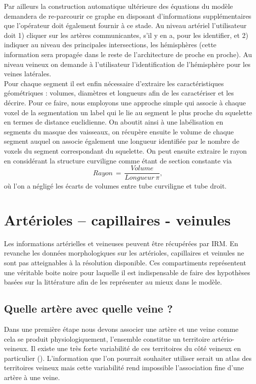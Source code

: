 Par ailleurs la construction automatique ultérieure des équations du modèle demandera de re-parcourir ce graphe en disposant d’informations supplémentaires que l’opérateur doit également fournir à ce stade. Au niveau artériel l’utilisateur doit 1) cliquer sur les artères communicantes, s’il y en a, pour les identifier, et 2) indiquer au niveau des principales intersections, les hémisphères (cette information sera propagée dans le reste de l’architecture de proche en proche). Au niveau veineux on demande à l’utilisateur l’identification de l’hémisphère pour les veines latérales.\\

Pour chaque segment il est enfin nécessaire d’extraire les caractéristiques géométriques : volumes, diamètres et longueurs afin de les caractériser et les décrire. Pour ce faire, nous employons une approche simple qui associe à chaque voxel de la segmentation un label qui le lie au segment le plus proche du squelette en termes de distance euclidienne. On aboutit ainsi à une labélisation en segments du masque des vaisseaux, on récupère ensuite le volume de chaque segment auquel on associe également une longueur identifiée par le nombre de voxels du segment correspondant du squelette. On peut ensuite extraire le rayon en considérant la structure curviligne comme étant de section constante via
\begin{equation}
\label{eq:rayons}
Rayon\,=\,\frac{Volume}{Longueur\,\pi},
\end{equation}
où l’on a négligé les écarts de volumes entre tube curviligne et tube droit. 
\section{Artérioles – capillaires - veinules}
Les informations artérielles et veineuses peuvent être récupérées par IRM. En revanche les données morphologiques sur les artérioles, capillaires et veinules ne sont pas atteignables à la résolution disponible. Ces compartiments représentent une véritable boite noire pour laquelle il est indispensable de faire des hypothèses basées sur la littérature afin de les représenter au mieux dans le modèle.
\subsection{Quelle artère avec quelle veine ? }
Dans une première étape nous devons associer une artère et une veine comme cela se produit physiologiquement, l’ensemble constitue un territoire artério-veineux. Il existe une très forte variabilité de ces territoires du côté veineux en particulier (\cite{Reiner2013}). L’information que l’on pourrait souhaiter utiliser serait un atlas des territoires veineux mais cette variabilité rend impossible l'association fine d'une artère à une veine.\\


